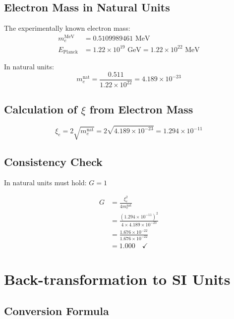 \documentclass[12pt,a4paper]{article}
\theoremstyle{definition}
\begin{document}
\subsection{Electron Mass in Natural Units}

The experimentally known electron mass:
\begin{align}
	m_e^{\text{MeV}} &= 0.5109989461 \text{ MeV}\\
	E_{\text{Planck}} &= 1.22 \times 10^{19} \text{ GeV} = 1.22 \times 10^{22} \text{ MeV}
\end{align}

In natural units:
\begin{equation}
	m_e^{\text{nat}} = \frac{0.511}{1.22 \times 10^{22}} = 4.189 \times 10^{-23}
\end{equation}

\subsection{Calculation of $\xi$ from Electron Mass}

\begin{equation}
	\xi_e = 2\sqrt{m_e^{\text{nat}}} = 2\sqrt{4.189 \times 10^{-23}} = 1.294 \times 10^{-11}
\end{equation}

\subsection{Consistency Check}

In natural units must hold: $G = 1$

\begin{align}
	G &= \frac{\xi_e^2}{4m_e^{\text{nat}}}\\
	&= \frac{(1.294 \times 10^{-11})^2}{4 \times 4.189 \times 10^{-23}}\\
	&= \frac{1.676 \times 10^{-22}}{1.676 \times 10^{-22}}\\
	&= 1.000 \quad \checkmark
\end{align}

\section{Back-transformation to SI Units}

\subsection{Conversion Formula}
\end{document}
